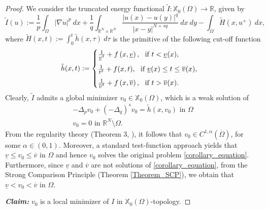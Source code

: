 \documentclass[reqno,oneside]{amsart}
\theoremstyle{definition}
\theoremstyle{remark}
\numberwithin{equation}{section}
\newcommand{\Om} {\Omega}
\newcommand{\sr}{\mathbb{R}}
\newcommand{\coa}{C^{1,\alpha}(\overline{\Om})}
\newcommand{\p}{\Delta_p}
\newcommand{\qs}{(-\Delta_q)^s}
\newcommand{\bdry}{\mathbb{R}^N \setminus \Omega}
\newcommand{\rar}{\rightarrow}
\newcommand{\na} {\nabla}
\newcommand{\xo}{\mathbb{X}_0}
\begin{document}
\begin{proof}
    We consider the truncated energy functional $\tilde{I} : \xo (\Om) \rar \sr$, given by
    \begin{equation}\label{I_tilde}
        \tilde{I}(u):= \frac{1}{p} \int_{\Om} |\na u|^p\ dx + \frac{1}{q} \int_{\sr^N \times \sr^N} \frac{|u(x) - u(y)|^q}{|x-y|^{N+sq}}\ dx\ dy - \int_{\Om} \tilde{H} \left(x,u^+ \right)\ dx,
    \end{equation}
    where $\tilde{H} (x,t):= \int_0^t \tilde{h}(x,\tau)\ d\tau$ is the primitive of the following cut-off function
    \[\tilde{h} (x,t):= \begin{cases}
        \frac{1}{\underline{v}^{\delta}} + f \left(x,\underline{v} \right),\ \text{ if } t < \underline{v} (x),\vspace{5pt}\\
        \frac{1}{t^{\delta}} + f(x,t),\ \text{ if } \underline{v} (x) \leq t \leq \overline{v} (x),\vspace{5pt}\\
        \frac{1}{\overline{v}^{\delta}} + f \left(x, \overline{v} \right),\ \text{ if } t> \overline{v} (x).
    \end{cases}\]
    Clearly, $\tilde{I}$ admits a global minimizer $v_0 \in \xo (\Om)$, which is a weak solution of
    \begin{equation}\label{h_tilde_equation}
        \begin{aligned}
            -\p v_0 + \qs v_0 = \tilde{h} (x,v_0) \text{ in } \Om\\
            v_0 = 0 \text{ in } \bdry.
        \end{aligned}
    \end{equation}
    From the regularity theory (Theorem 3, \cite{dhanya2026regularity}), it follows that $v_0 \in \coa$, for some $\alpha\in (0,1)$. Moreover, a standard test-function approach yields that $\underline{v} \leq v_0 \leq \overline{v}$ in $\Om$ and hence $v_0$ solves the original problem \eqref{corollary_equation}. Furthermore, since $\underline{v}$ and $\overline{v}$ are not solutions of \eqref{corollary_equation}, from the Strong Comparison Principle (Theorem \ref{Theorem_SCP}), we obtain that $\underline{v} < v_0 < \overline{v}$ in $\Om$.
    \vspace{5pt}

    \noindent\textit{\textbf{Claim:}} $v_0$ is a local minimizer of $I$ in $\xo (\Om)$-topology.
    \vspace{5pt}


\end{proof}
\end{document}
